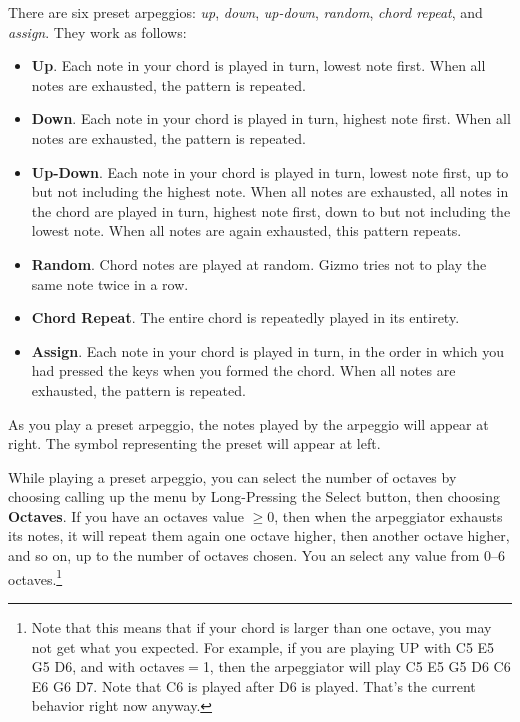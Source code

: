 \documentclass{article}
\begin{document}
There are six preset arpeggios: {\it up}, {\it down}, {\it up-down}, {\it random}, {\it chord repeat}, and {\it assign}.  They work as follows:

\begin{itemize}
\item {\bf Up}.  Each note in your chord is played in turn, lowest note first.  When all notes are exhausted, the pattern is repeated.
\item {\bf Down}.  Each note in your chord is played in turn, highest note first.  When all notes are exhausted, the pattern is repeated.
\item {\bf Up-Down}.  Each note in your chord is played in turn, lowest note first, up to but not including the highest note.  When all notes are exhausted, all notes in the chord are played in turn, highest note first, down to but not including the lowest note.  When all notes are again exhausted, this pattern repeats.

\item {\bf Random}.  Chord notes are played at random.  Gizmo tries not to play the same note twice in a row.
\item {\bf Chord Repeat}.  The entire chord is repeatedly played in its entirety.
\item {\bf Assign}. Each note in your chord is played in turn, in the order in which you had pressed the keys when you formed the chord.  When all notes are exhausted, the pattern is repeated.
\end{itemize}

As you play a preset arpeggio, the notes played by the arpeggio will appear at right.  The symbol representing the preset will appear at left.

While playing a preset arpeggio, you can select the number of octaves by choosing calling up the menu by Long-Pressing the Select button, then choosing {\bf Octaves}.  If you have an octaves value \(\geq 0\), then when the arpeggiator exhausts its notes, it will repeat them again one octave higher, then another octave higher, and so on, up to the number of octaves chosen. You an select any value from 0--6 octaves.\footnote{Note that this means that if your chord is larger than one octave, you may not get what you expected.  For example, if you are playing UP with C5 E5 G5 D6, and with octaves\(=\)1, then the arpeggiator will play C5 E5 G5 D6 C6 E6 G6 D7.  Note that C6 is played after D6 is played.  That's the current behavior right now anyway.}
\end{document}
